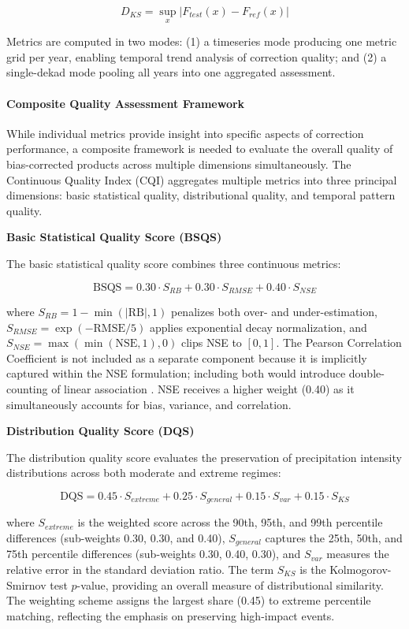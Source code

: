 \documentclass[remotesensing,article,submit,pdftex,moreauthors]{Definitions/mdpi}
\begin{document}
\[D_{KS} = \sup_{x} |F_{test}(x) - F_{ref}(x)|\]

Metrics are computed in two modes: (1) a timeseries mode producing one
metric grid per year, enabling temporal trend analysis of correction
quality; and (2) a single-dekad mode pooling all years into one
aggregated assessment.

\paragraph{Composite Quality Assessment
Framework}\label{composite-quality-assessment-framework}

While individual metrics provide insight into specific aspects of
correction performance, a composite framework is needed to evaluate the
overall quality of bias-corrected products across multiple dimensions
simultaneously. The Continuous Quality Index (CQI) aggregates multiple
metrics into three principal dimensions: basic statistical quality,
distributional quality, and temporal pattern quality.

\textbf{Basic Statistical Quality Score (BSQS)}

The basic statistical quality score combines three continuous metrics:

\[\text{BSQS} = 0.30 \cdot S_{RB} + 0.30 \cdot S_{RMSE} + 0.40 \cdot S_{NSE}\]

where \(S_{RB} = 1 - \min(|\text{RB}|, 1)\) penalizes both over- and
under-estimation, \(S_{RMSE} = \exp(-\text{RMSE}/5)\) applies
exponential decay normalization, and
\(S_{NSE} = \max(\min(\text{NSE}, 1), 0)\) clips NSE to \([0, 1]\). The
Pearson Correlation Coefficient is not included as a separate component
because it is implicitly captured within the NSE formulation; including
both would introduce double-counting of linear association \cite{ref30}. NSE
receives a higher weight (0.40) as it simultaneously accounts for bias,
variance, and correlation.

\textbf{Distribution Quality Score (DQS)}

The distribution quality score evaluates the preservation of
precipitation intensity distributions across both moderate and extreme
regimes:

\[\text{DQS} = 0.45 \cdot S_{extreme} + 0.25 \cdot S_{general} + 0.15 \cdot S_{var} + 0.15 \cdot S_{KS}\]

where \(S_{extreme}\) is the weighted score across the 90th, 95th, and
99th percentile differences (sub-weights 0.30, 0.30, and 0.40),
\(S_{general}\) captures the 25th, 50th, and 75th percentile differences
(sub-weights 0.30, 0.40, 0.30), and \(S_{var}\) measures the relative
error in the standard deviation ratio. The term \(S_{KS}\) is the
Kolmogorov-Smirnov test \(p\)-value, providing an overall measure of
distributional similarity. The weighting scheme assigns the largest
share (0.45) to extreme percentile matching, reflecting the emphasis on
preserving high-impact events.
\end{document}
